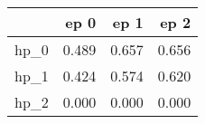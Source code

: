 \begin{tabular}{lrrr}
\toprule
{} &   ep 0 &   ep 1 &   ep 2 \\
\midrule
hp\_0 &  0.489 &  0.657 &  0.656 \\
hp\_1 &  0.424 &  0.574 &  0.620 \\
hp\_2 &  0.000 &  0.000 &  0.000 \\
\bottomrule
\end{tabular}

